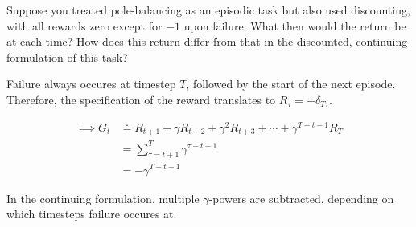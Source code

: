 
\begin{exercise}[Exercise 3.6]

Suppose you treated pole-balancing as an episodic task but also used discounting, with all rewards zero except for $-1$ upon failure.
What then would the return be at each time?
How does this return differ from that in the discounted, continuing formulation of this task?

\end{exercise}


\begin{solution}

Failure always occures at timestep $T$, followed by the start of the next episode.
Therefore, the specification  of the reward translates to $R_\tau = -\delta_{T \tau}$.

\begin{align*}
    \implies
    G_t
    & \doteq
    R_{t+1} + \gamma R_{t+2} + \gamma^2 R_{t+3} + \cdots + \gamma^{T-t-1} R_T \\
    & =
    \sum_{\tau = t+1}^T
        \gamma^{\tau - t - 1} \\
    & =
    -\gamma^{T-t-1}
\end{align*}

In the continuing formulation, multiple $\gamma$-powers are subtracted, depending on which timesteps failure occures at.

\end{solution}


